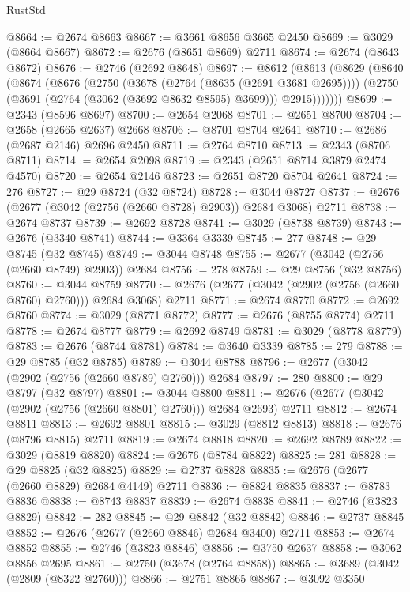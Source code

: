 \begin{lexlean}{RustStd}
\begin{coremodule}
@8664 := @2674 @8663
@8667 := @3661 @8656 @3665 @2450
@8669 := @3029 (@8664 @8667)
@8672 := @2676 (@8651 @8669) @2711
@8674 := @2674 (@8643 @8672)
@8676 := @2746 (@2692 @8648)
@8697 := @8612
    (@8613
      (@8629
        (@8640
          (@8674
            (@8676
              (@2750
                (@3678 (@2764 (@8635 (@2691 @3681 @2695))))
                (@2750 (@3691 (@2764 (@3062 (@3692 @8632 @8595) @3699))) @2915)))))))
@8699 := @2343 (@8596 @8697)
@8700 := @2654 @2068
@8701 := @2651 @8700
@8704 := @2658 (@2665 @2637) @2668
@8706 := @8701 @8704 @2641
@8710 := @2686 (@2687 @2146) @2696 @2450
@8711 := @2764 @8710
@8713 := @2343 (@8706 @8711)
@8714 := @2654 @2098
@8719 := @2343 (@2651 @8714 @3879 @2474 @4570)
@8720 := @2654 @2146
@8723 := @2651 @8720 @8704 @2641
@8724 := 276
@8727 := @29 @8724 (@32 @8724)
@8728 := @3044 @8727
@8737 := @2676 (@2677 (@3042 (@2756 (@2660 @8728) @2903)) @2684 @3068) @2711
@8738 := @2674 @8737
@8739 := @2692 @8728
@8741 := @3029 (@8738 @8739)
@8743 := @2676 (@3340 @8741)
@8744 := @3364 @3339
@8745 := 277
@8748 := @29 @8745 (@32 @8745)
@8749 := @3044 @8748
@8755 := @2677 (@3042 (@2756 (@2660 @8749) @2903)) @2684
@8756 := 278
@8759 := @29 @8756 (@32 @8756)
@8760 := @3044 @8759
@8770 := @2676 (@2677 (@3042 (@2902 (@2756 (@2660 @8760) @2760))) @2684 @3068) @2711
@8771 := @2674 @8770
@8772 := @2692 @8760
@8774 := @3029 (@8771 @8772)
@8777 := @2676 (@8755 @8774) @2711
@8778 := @2674 @8777
@8779 := @2692 @8749
@8781 := @3029 (@8778 @8779)
@8783 := @2676 (@8744 @8781)
@8784 := @3640 @3339
@8785 := 279
@8788 := @29 @8785 (@32 @8785)
@8789 := @3044 @8788
@8796 := @2677 (@3042 (@2902 (@2756 (@2660 @8789) @2760))) @2684
@8797 := 280
@8800 := @29 @8797 (@32 @8797)
@8801 := @3044 @8800
@8811 := @2676 (@2677 (@3042 (@2902 (@2756 (@2660 @8801) @2760))) @2684 @2693) @2711
@8812 := @2674 @8811
@8813 := @2692 @8801
@8815 := @3029 (@8812 @8813)
@8818 := @2676 (@8796 @8815) @2711
@8819 := @2674 @8818
@8820 := @2692 @8789
@8822 := @3029 (@8819 @8820)
@8824 := @2676 (@8784 @8822)
@8825 := 281
@8828 := @29 @8825 (@32 @8825)
@8829 := @2737 @8828
@8835 := @2676 (@2677 (@2660 @8829) @2684 @4149) @2711
@8836 := @8824 @8835
@8837 := @8783 @8836
@8838 := @8743 @8837
@8839 := @2674 @8838
@8841 := @2746 (@3823 @8829)
@8842 := 282
@8845 := @29 @8842 (@32 @8842)
@8846 := @2737 @8845
@8852 := @2676 (@2677 (@2660 @8846) @2684 @3400) @2711
@8853 := @2674 @8852
@8855 := @2746 (@3823 @8846)
@8856 := @3750 @2637
@8858 := @3062 @8856 @2695
@8861 := @2750 (@3678 (@2764 @8858))
@8865 := @3689 (@3042 (@2809 (@8322 @2760)))
@8866 := @2751 @8865
@8867 := @3092 @3350

\end{coremodule}
\end{lexlean}
